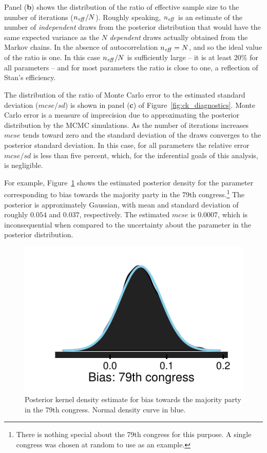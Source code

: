 Panel ({\bf b}) shows the distribution of the ratio of effective sample size to the number of 
iterations ($n_{\it eff}/N$). Roughly speaking, $n_{\it eff}$ is an estimate of the number of 
{\it independent} draws from the posterior distribution that would have the same expected 
variance as the $N$ {\it dependent} draws actually obtained from the 
Markov chains. In the absence of autocorrelation $n_{\it eff} = N$, and so the ideal value of 
the ratio is one. In this case $n_{\it eff}/N$ is sufficiently large -- it is at least 20\% for all 
parameters -- and for most parameters the ratio is close to one, a reflection of Stan's efficiency. 


The distribution of the ratio of Monte Carlo error to the estimated standard 
deviation ($mcse/sd$) is shown in panel ({\bf c}) of Figure~\ref{fig:ck_diagnostics}. 
Monte Carlo error is a measure of imprecision due to approximating 
the posterior distribution by the MCMC simulations. As the number of iterations increases 
$mcse$ tends toward zero and the standard deviation of the draws converges to the posterior 
standard deviation. In this case, for all parameters the relative error $mcse/sd$ is less 
than five percent, which, for the inferential goals of this analysis, is negligible. 

For example, Figure~\ref{fig:ck_example_posterior} shows the estimated 
posterior density for the parameter corresponding to bias towards the majority party in the 79th 
congress.\footnote{There is nothing special about the 79th congress for this purpose. A single 
congress was chosen at random to use as an example.} The posterior is approximately Gaussian, 
with mean and standard deviation of roughly $0.054$ and $0.037$, respectively. The 
estimated $mcse$ is $0.0007$, which is inconsequential when compared to the uncertainty about 
the parameter in the posterior distribution.   


\begin{figure}[h]
\centering
	\includegraphics[scale=0.75]{sections/figs/example_posterior}
\caption{Posterior kernel density estimate for bias towards the majority party in the 79th congress. 
Normal density curve in blue.}
\label{fig:ck_example_posterior}
\end{figure}


